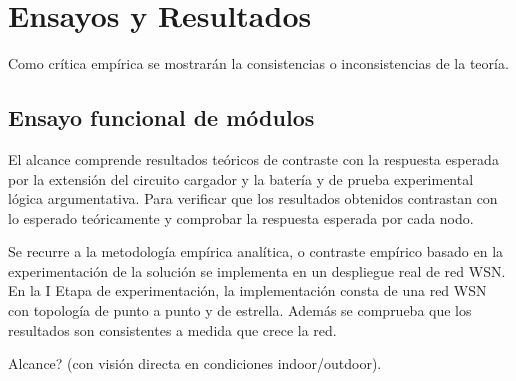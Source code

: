 
\chapter{Ensayos y Resultados} %

\label{Chapter4} %


Como crítica empírica se mostrarán la consistencias o inconsistencias de la teoría.
%
%

\section{Ensayo funcional de módulos}
\label{sec:funcional}

El alcance comprende resultados teóricos de contraste con la respuesta esperada por la extensión del circuito cargador y la batería y de prueba experimental lógica argumentativa. Para verificar que los resultados obtenidos contrastan con lo esperado teóricamente y comprobar la respuesta esperada por cada nodo.

Se recurre a la metodología empírica analítica, o contraste empírico basado en la experimentación de la solución se implementa en un despliegue real de red WSN. En la I Etapa de experimentación, la implementación consta de una red WSN con topología de punto a punto y de estrella. Además se comprueba que los resultados son consistentes a medida que crece la red.

Alcance? (con visión directa en condiciones indoor/outdoor).



